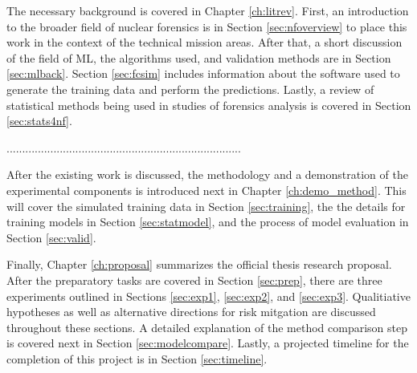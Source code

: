 The necessary background is covered in Chapter \ref{ch:litrev}.  First, an
introduction to the broader field of nuclear forensics is in Section
\ref{sec:nfoverview} to place this work in the context of the technical mission
areas. After that, a short discussion of the field of \gls{ML}, the algorithms
used, and validation methods are in Section \ref{sec:mlback}.
Section \ref{sec:fcsim} includes information about the software used to
generate the training data and perform the predictions. Lastly, a review of
statistical methods being used in studies of forensics analysis is covered in
Section \ref{sec:stats4nf}. 

...........................................................................

After the existing work is discussed, the methodology and a demonstration of
the experimental components is introduced next in Chapter \ref{ch:demo_method}.
This will cover the simulated training data in Section \ref{sec:training}, the
the details for training models in Section \ref{sec:statmodel}, and the
process of model evaluation in Section \ref{sec:valid}.  

Finally, Chapter \ref{ch:proposal} summarizes the official thesis research
proposal. After the preparatory tasks are covered in Section \ref{sec:prep},
there are three experiments outlined in Sections \ref{sec:exp1},
\ref{sec:exp2}, and \ref{sec:exp3}. Qualitiative hypotheses as well as
alternative directions for risk mitgation are discussed throughout these
sections.  A detailed explanation of the method comparison step is covered next
in Section \ref{sec:modelcompare}.  Lastly, a projected timeline for the
completion of this project is in Section \ref{sec:timeline}.
